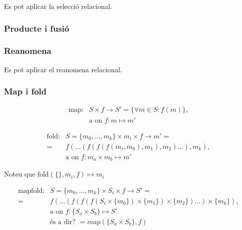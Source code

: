 Es pot aplicar la selecció relacional.



\subsubsection{Producte i fusió}




\subsubsection{Reanomena}

Es pot aplicar el reanomena relacional.






\subsubsection{Map i fold}

\begin{align*}
  \text{map}:& S \times f \longrightarrow S' = \{\forall m\in S : f(m) \}, \\
             & \text{a on } f: m \mapsto m' 
\end{align*}





\begin{align*}
  \text{fold}: & S=\{m_0,\dotsc,m_k\} \times m_i \times f \longrightarrow m'= \\
               =& f(\dots(f(f(f(m_i,m_0),m_1),m_2)\dots),m_k), \\
               & \text{a on } f: m_a \times m_b \mapsto m'
\end{align*}


Noteu que $\text{fold}(\{\},m_i,f) \mapsto m_i$ 







\begin{align*}
  \text{mapfold}: & S=\{m_0,\dotsc,m_k\} \times S_i \times f \longrightarrow S'= \\
                 =& f(\dots(f(f(f(S_i\times\{m_0\})\times\{m_1\})\times\{m_2\})\dots)\times\{m_k\}), \\
                  & \text{a on } f: \{S_a \times S_b \}\mapsto S'\\
                  & \text{és a dir? } =map( \{S_a \times S_b \},f)
\end{align*}



